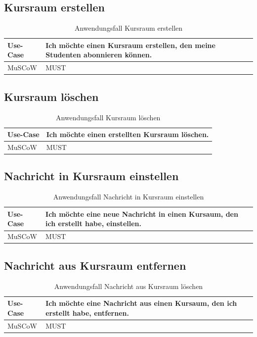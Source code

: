 \subsection{Kursraum erstellen}

  \begin{table}[H]
    \begin{tabular}{| a | p{12cm} |}
      \hline
      Use-Case & Ich möchte einen Kursraum erstellen, den meine Studenten abonnieren können. \\
      \hline
      MuSCoW & MUST
    \end{tabular}
  \caption{Anwendungsfall Kursraum erstellen}
  \label{use-case-create-classroom}
  \end{table}


\subsection{Kursraum löschen}
  \begin{table}[H]
    \begin{tabular}{| a | p{12cm} |}
      \hline
      Use-Case & Ich möchte einen erstellten Kursraum löschen. \\
      \hline
      MuSCoW & MUST
    \end{tabular}
  \caption{Anwendungsfall Kursraum löschen}
  \label{use-case-delete-classroom}
  \end{table}


\subsection{Nachricht in Kursraum einstellen}
  \begin{table}[H]
    \begin{tabular}{| a | p{12cm} |}
      \hline
      Use-Case & Ich möchte eine neue Nachricht in einen Kursaum, den ich erstellt habe, einstellen. \\
      \hline
      MuSCoW & MUST
    \end{tabular}
  \caption{Anwendungsfall Nachricht in Kursraum einstellen}
  \label{use-case-post-message}
  \end{table}

\subsection{Nachricht aus Kursraum entfernen}
  \begin{table}[H]
    \begin{tabular}{| a | p{12cm} |}
      \hline
      Use-Case & Ich möchte eine Nachricht aus einen Kursaum, den ich erstellt habe, entfernen. \\
      \hline
      MuSCoW & MUST
    \end{tabular}
  \caption{Anwendungsfall Nachricht aus Kursraum löschen}
  \label{use-case-delete-message}
  \end{table}


